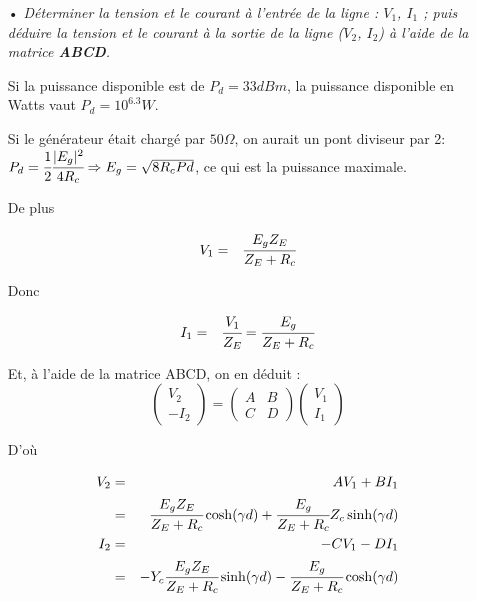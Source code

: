 \documentclass[10pt]{article}
\begin{document}
\begin{itemize}
    \item[•] \textit{Déterminer la tension et le courant à l'entrée de la ligne : $V_1$, $I_1$ ; puis déduire la tension et le courant à la sortie de la ligne ($V_2$, $I_2$) à l'aide de la matrice \textbf{ABCD}.}

        Si la puissance disponible est de $P_d = 33 dBm$, la puissance disponible en Watts vaut $P_d = 10^{6.3}W$.

        Si le générateur était chargé par $50 \Omega$, on aurait un pont diviseur par 2: $P_d = \cfrac{1}{2} \cfrac{|E_g|^2}{4R_c} \Rightarrow E_g = \sqrt{8 R_c Pd}$, ce qui est la puissance maximale.

        De plus

        \begin{eqnarray}
            V_1 &=& \cfrac{E_g Z_E}{Z_E+R_c}
        \end{eqnarray}

        Donc

        \begin{eqnarray}
            I_1 &=& \cfrac{V_1}{Z_E} = \cfrac{E_g}{Z_E+R_c}
        \end{eqnarray}

        Et, à l'aide de la matrice ABCD, on en déduit : 
        \[
            \begin{pmatrix}
                V_2 \\
                -I_2
            \end{pmatrix}
            =
            \begin{pmatrix}
                A & B \\
                C & D
            \end{pmatrix}
            \begin{pmatrix}
                V_1 \\
                I_1
            \end{pmatrix}
        \]

        D'où

        \begin{eqnarray}
            V_2 &=& A V_1 + B I_1 \nonumber \\
            &=& \cfrac{E_g Z_E}{Z_E+R_c} \cosh(\gamma d) + \cfrac{E_g}{Z_E+R_c} Z_c \sinh(\gamma d)\\
            I_2 &=& -C V_1 - D I_1 \nonumber \\
            &=& - Y_c \cfrac{E_g Z_E}{Z_E+R_c} \sinh(\gamma d) - \cfrac{E_g}{Z_E+R_c} \cosh(\gamma d)
        \end{eqnarray}


\end{itemize}
\end{document}
